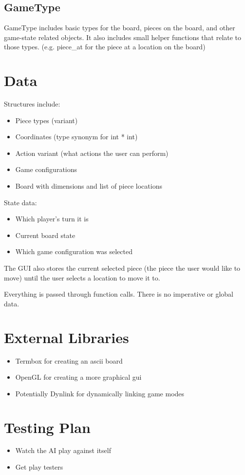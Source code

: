 \documentclass[11pt, oneside]{article}
\begin{document}
\subsection{GameType}
GameType includes basic types for the board, pieces on the board, and other
game-state related objects. It also includes small helper functions that relate
to those types. (e.g. piece\_at for the piece at a location on the board)

\section{Data}
Structures include:
\begin{itemize}
\item Piece types (variant)
\item Coordinates (type synonym for int * int)
\item Action variant (what actions the user can perform)
\item Game configurations
\item Board with dimensions and list of piece locations
\end{itemize}

State data:
\begin{itemize}
\item Which player's turn it is
\item Current board state
\item Which game configuration was selected
\end{itemize}
The GUI also stores the current selected piece (the piece the user would like to
move) until the user selects a location to move it to.

Everything is passed through function calls. There is no imperative or global
data.

\section{External Libraries}
\begin{itemize}
\item Termbox for creating an ascii board
\item OpenGL for creating a more graphical gui
\item Potentially Dynlink for dynamically linking game modes
\end{itemize}

\section{Testing Plan}
\begin{itemize}
\item Watch the AI play against itself
\item Get play testers
\end{itemize}
\end{document}
